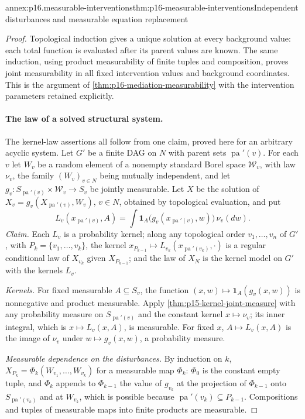 \begin{annexitem}{annex:p16.measurable-interventions}{thm:p16-measurable-interventions}{Independent disturbances and measurable equation replacement}
\begin{proof}
Topological induction gives a unique solution at every background
value: each total function is evaluated after its parent values are
known. The same induction, using product measurability of finite
tuples and composition, proves joint measurability in all fixed
intervention values and background coordinates. This is the argument
of \cref{thm:p16-mediation-measurability} with the intervention
parameters retained explicitly.

\paragraph{The law of a solved structural system.}
The kernel-law assertions all follow from one claim, proved here for an
arbitrary acyclic system. Let \(G'\) be a finite DAG on \(N\) with parent
sets \(\operatorname{pa}'(v)\). For each \(v\) let \(W_v\) be a random
element of a nonempty standard Borel space \(\mathcal W_v\), with law
\(\nu_v\), the family \((W_v)_{v\in N}\) being mutually independent,
and let \(g_v:S_{\operatorname{pa}'(v)}\times\mathcal W_v\to S_v\) be
jointly measurable. Let \(X\) be the solution of
\(X_v=g_v(X_{\operatorname{pa}'(v)},W_v)\), \(v\in N\), obtained by
topological evaluation, and put
\[
 L_v(x_{\operatorname{pa}'(v)},A)
   =\int\mathbf 1_A\bigl(g_v(x_{\operatorname{pa}'(v)},w)\bigr)\,
      \nu_v(dw).
\]
\emph{Claim.} Each \(L_v\) is a probability kernel; along any topological
order \(v_1,\ldots,v_n\) of \(G'\), with \(P_k=\{v_1,\ldots,v_k\}\),
the kernel \(x_{P_{k-1}}\mapsto L_{v_k}(x_{\operatorname{pa}'(v_k)},\cdot)\)
is a regular conditional law of \(X_{v_k}\) given \(X_{P_{k-1}}\); and
the law of \(X_N\) is the kernel model on \(G'\) with the kernels
\(L_v\).

\emph{Kernels.} For fixed measurable \(A\subseteq S_v\), the function
\((x,w)\mapsto\mathbf 1_A(g_v(x,w))\) is nonnegative and product
measurable. Apply \cref{thm:p15-kernel-joint-measure} with any
probability measure on \(S_{\operatorname{pa}'(v)}\) and the constant
kernel \(x\mapsto\nu_v\); its inner integral, which is
\(x\mapsto L_v(x,A)\), is measurable. For fixed \(x\),
\(A\mapsto L_v(x,A)\) is the image of \(\nu_v\) under
\(w\mapsto g_v(x,w)\), a probability measure.

\emph{Measurable dependence on the disturbances.} By induction on \(k\),
\(X_{P_k}=\Phi_k(W_{v_1},\ldots,W_{v_k})\) for a measurable map
\(\Phi_k\): \(\Phi_0\) is the constant empty tuple, and \(\Phi_k\) appends
to \(\Phi_{k-1}\) the value of \(g_{v_k}\) at the projection of
\(\Phi_{k-1}\) onto \(S_{\operatorname{pa}'(v_k)}\) and at \(W_{v_k}\),
which is possible because \(\operatorname{pa}'(v_k)\subseteq P_{k-1}\).
Compositions and tuples of measurable maps into finite products are
measurable.


\end{proof}
\end{annexitem}
